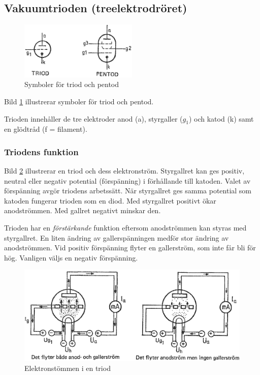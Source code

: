 \subsection{Vakuumtrioden (treelektrodröret)}

\begin{figure}[ht]
\begin{center}
  \includegraphics[width=0.5\textwidth]{images/cropped_pdfs/bild_2_2-30.pdf}
  \caption{Symboler för triod och pentod}
  \label{fig:BildII2-30}
\end{center}
\end{figure}

Bild \ref{fig:BildII2-30} illustrerar symboler för triod och pentod.

Trioden innehåller de tre elektroder anod (a), styrgaller (\(g_1\)) och katod (k) 
samt en glödtråd (f = filament).

\subsubsection{Triodens funktion}

Bild \ref{fig:BildII2-31} illustrerar en triod och dess elektronström.
Styrgallret kan ges positiv, neutral eller negativ potential (förspänning) i förhållande till katoden.
Valet av förspänning avgör triodens arbetssätt.
När styrgallret ges samma potential som katoden fungerar trioden som en diod.
Med styrgallret positivt ökar anodströmmen.
Med gallret negativt minskar den.

Trioden har en \emph{förstärkande} funktion eftersom anodströmmen kan styras med
styrgallret. En liten ändring av gallerspänningen medför stor ändring av anodströmmen.
Vid positiv förspänning flyter en gallerström, som inte får bli för hög.
Vanligen väljs en negativ förspänning.

\begin{figure}[ht]
\includegraphics[width=\textwidth]{images/cropped_pdfs/bild_2_2-31.pdf}
\caption{Elektronstömmen i en triod}
\label{fig:BildII2-31}
\end{figure}

